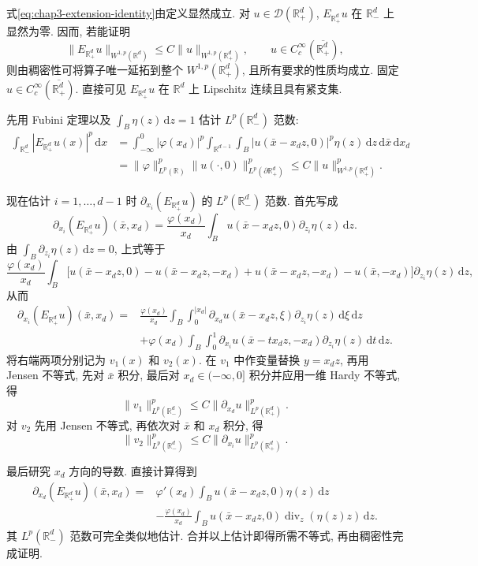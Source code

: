 \begin{Proof}
式\eqref{eq:chap3-extension-identity}由定义显然成立. 对 $u\in\mathcal D(\mathbb R_+^d)$, $E_{\mathbb R_+^d}u$ 在 $\mathbb R_-^d$ 上显然为零. 因而, 若能证明
\[
 \|E_{\mathbb R_+^d}u\|_{W^{1,p}(\mathbb R^d)}
 \leq C\|u\|_{W^{1,p}(\mathbb R_+^d)},
 \qquad u\in C_c^\infty(\overline{\mathbb R_+^d}),
\]
则由稠密性可将算子唯一延拓到整个 $W^{1,p}(\mathbb R_+^d)$, 且所有要求的性质均成立. 固定 $u\in C_c^\infty(\overline{\mathbb R_+^d})$. 直接可见 $E_{\mathbb R_+^d}u$ 在 $\mathbb R^d$ 上 Lipschitz 连续且具有紧支集.

先用 Fubini 定理以及 $\int_B\eta(z)\,\mathrm dz=1$ 估计 $L^p(\mathbb R_-^d)$ 范数:
\begin{align*}
 \int_{\mathbb R_-^d}|E_{\mathbb R_+^d}u(x)|^p\,\mathrm dx
 &=\int_{-\infty}^0|\varphi(x_d)|^p
   \int_{\mathbb R^{d-1}}\int_B|u(\bar x-x_dz,0)|^p\eta(z)\,\mathrm dz\,\mathrm d\bar x\,\mathrm dx_d\\
 &=\|\varphi\|_{L^p(\mathbb R)}^p\|u(\cdot,0)\|_{L^p(\partial\mathbb R_+^d)}^p
 \leq C\|u\|_{W^{1,p}(\mathbb R_+^d)}^p.
\end{align*}

现在估计 $i=1,\ldots,d-1$ 时 $\partial_{x_i}(E_{\mathbb R_+^d}u)$ 的 $L^p(\mathbb R_-^d)$ 范数. 首先写成
\[
 \partial_{x_i}(E_{\mathbb R_+^d}u)(\bar x,x_d)
 =\frac{\varphi(x_d)}{x_d}\int_Bu(\bar x-x_dz,0)\partial_{z_i}\eta(z)\,\mathrm dz.
\]
由 $\int_B\partial_{z_i}\eta(z)\,\mathrm dz=0$, 上式等于
\[
 \frac{\varphi(x_d)}{x_d}\int_B
 \bigl[u(\bar x-x_dz,0)-u(\bar x-x_dz,-x_d)
 +u(\bar x-x_dz,-x_d)-u(\bar x,-x_d)\bigr]
 \partial_{z_i}\eta(z)\,\mathrm dz,
\]
从而
\begin{align*}
 \partial_{x_i}(E_{\mathbb R_+^d}u)(\bar x,x_d)
 ={}&\frac{\varphi(x_d)}{x_d}\int_B\int_0^{|x_d|}
 \partial_{x_d}u(\bar x-x_dz,\xi)\partial_{z_i}\eta(z)\,\mathrm d\xi\,\mathrm dz\\
 &+\varphi(x_d)\int_B\int_0^1
 \partial_{x_i}u(\bar x-tx_dz,-x_d)\partial_{z_i}\eta(z)\,\mathrm dt\,\mathrm dz.
\end{align*}
将右端两项分别记为 $v_1(x)$ 和 $v_2(x)$. 在 $v_1$ 中作变量替换 $y=x_dz$, 再用 Jensen 不等式, 先对 $\bar x$ 积分, 最后对 $x_d\in(-\infty,0]$ 积分并应用一维 Hardy 不等式, 得
\[
 \|v_1\|_{L^p(\mathbb R_-^d)}^p
 \leq C\|\partial_{x_d}u\|_{L^p(\mathbb R_+^d)}^p.
\]
对 $v_2$ 先用 Jensen 不等式, 再依次对 $\bar x$ 和 $x_d$ 积分, 得
\[
 \|v_2\|_{L^p(\mathbb R_-^d)}^p
 \leq C\|\partial_{x_i}u\|_{L^p(\mathbb R_+^d)}^p.
\]

最后研究 $x_d$ 方向的导数. 直接计算得到
\begin{align*}
 \partial_{x_d}(E_{\mathbb R_+^d}u)(\bar x,x_d)
 ={}&\varphi'(x_d)\int_Bu(\bar x-x_dz,0)\eta(z)\,\mathrm dz\\
 &-\frac{\varphi(x_d)}{x_d}\int_Bu(\bar x-x_dz,0)
 \operatorname{div}_z(\eta(z)z)\,\mathrm dz.
\end{align*}
其 $L^p(\mathbb R_-^d)$ 范数可完全类似地估计. 合并以上估计即得所需不等式, 再由稠密性完成证明.
\end{Proof}

